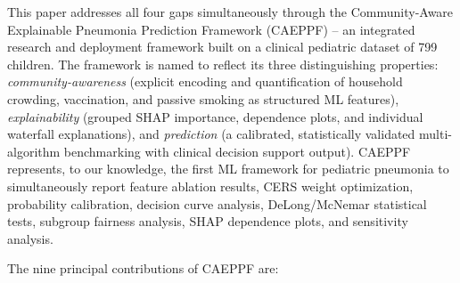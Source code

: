 \documentclass[3p,times,twocolumn]{elsarticle}
\begin{document}
This paper addresses all four gaps simultaneously through the Community-Aware Explainable Pneumonia Prediction Framework (CAEPPF) -- an integrated research and deployment framework built on a clinical pediatric dataset of 799 children. The framework is named to reflect its three distinguishing properties: \textit{community-awareness} (explicit encoding and quantification of household crowding, vaccination, and passive smoking as structured ML features), \textit{explainability} (grouped SHAP importance, dependence plots, and individual waterfall explanations), and \textit{prediction} (a calibrated, statistically validated multi-algorithm benchmarking with clinical decision support output). CAEPPF represents, to our knowledge, the first ML framework for pediatric pneumonia to simultaneously report feature ablation results, CERS weight optimization, probability calibration, decision curve analysis, DeLong/McNemar statistical tests, subgroup fairness analysis, SHAP dependence plots, and sensitivity analysis.

The nine principal contributions of CAEPPF are:
\end{document}
